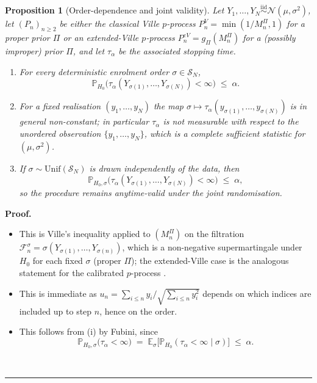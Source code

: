 \documentclass{article}%
\newtheorem{proposition}[theorem]{Proposition}
\newenvironment{proof}[1][Proof]{\noindent\textbf{#1.} }{\ \rule{0.5em}{0.5em}}
\newcommand{\Prob}{\mathbb{P}}
\newcommand{\1}{\mathbf{1}}
\begin{document}
\begin{proposition}[Order-dependence and joint validity]
\label{prop:order-dependence}
Let $Y_{1},\ldots,Y_{N}\stackrel{\mathrm{iid}}{\sim}\mathcal{N}(\mu,\sigma^{2})$, let $(P_{n})_{n\ge 2}$ be either the classical Ville $p$-process $P_{n}^{V}=\min(1/M_{n}^{\Pi},1)$ for a proper prior $\Pi$ or an extended-Ville $p$-process $P_{n}^{eV}=g_{\Pi}(M_{n}^{\Pi})$ for a (possibly improper) prior $\Pi$, and let $\tau_{\alpha}$ be the associated stopping time.
\begin{enumerate}
\item[(i)] For every deterministic enrolment order $\sigma\in\mathcal{S}_{N}$,
   \[
      \Prob_{H_{0}}\bigl(\tau_{\alpha}(Y_{\sigma(1)},\ldots,Y_{\sigma(N)})<\infty\bigr)\;\le\;\alpha.
   \]
\item[(ii)] For a fixed realisation $(y_{1},\ldots,y_{N})$ the map $\sigma\mapsto\tau_{\alpha}(y_{\sigma(1)},\ldots,y_{\sigma(N)})$ is in general non-constant; in particular $\tau_{\alpha}$ is not measurable with respect to the unordered observation $\{y_{1},\ldots,y_{N}\}$, which is a complete sufficient statistic for $(\mu,\sigma^{2})$.
\item[(iii)] If $\sigma\sim\mathrm{Unif}(\mathcal{S}_{N})$ is drawn independently of the data, then
   \[
      \Prob_{H_{0},\sigma}\bigl(\tau_{\alpha}(Y_{\sigma(1)},\ldots,Y_{\sigma(N)})<\infty\bigr)\;\le\;\alpha,
   \]
   so the procedure remains anytime-valid under the joint randomisation.
\end{enumerate}
\end{proposition}

\begin{proof}
\begin{itemize}
\item[(i)] This is Ville's inequality applied to $(M_{n}^{\Pi})$ on the filtration $\mathcal{F}_{n}^{\sigma}=\sigma(Y_{\sigma(1)},\ldots,Y_{\sigma(n)})$, which is a non-negative supermartingale under $H_{0}$ for each fixed $\sigma$ (proper $\Pi$); the extended-Ville case is the analogous statement for the calibrated $p$-process \citep{wang2025extended}. 

\item[(ii)] This is immediate as $u_{n}=\sum_{i\le n}y_{i}/\sqrt{\sum_{i\le n}y_{i}^{2}}$ depends on which indices are included up to step $n$, hence on the order. 

\item[(iii)] This follows from (i) by Fubini, since
\[
   \Prob_{H_{0},\sigma}\bigl(\tau_{\alpha}<\infty\bigr) \;=\; \mathbb{E}_{\sigma}\bigl[\Prob_{H_{0}}(\tau_{\alpha}<\infty\mid\sigma)\bigr]\;\le\;\alpha.
\]
\end{itemize}
\end{proof}
\end{document}
